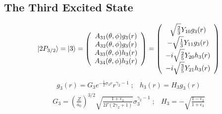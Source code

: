     \subsection{The Third Excited State}
    \begin{equation}
	|2P_{3/2} \rangle = |3 \rangle = 
		\left(
			\begin{array}{c}
				A_{31}(\theta,\phi) g_3(r) \\
				A_{32}(\theta,\phi) g_3(r) \\
				A_{33}(\theta,\phi) h_3(r) \\
				A_{34}(\theta,\phi) h_3(r)
			\end{array}
		\right)
		=
		\left(
			\begin{array}{c}
				\sqrt{\frac{2}{3}} Y_{10} g_3(r) \\
			   -\sqrt{\frac{1}{3}} Y_{11} g_3(r) \\
			 -i \sqrt{\frac{2}{5}} Y_{20} h_3(r) \\
			 -i \sqrt{\frac{3}{5}} Y_{21} h_3(r)
			\end{array}
		\right)
\end{equation}
\begin{equation}
    \begin{array}{cc}
		g_3(r) = G_3 e^{-\frac{1}{2}\sigma_3 r}	r^{\gamma_2 - 1} 
        \; ; &
        h_3(r) = H_3 g_3(r)
    \end{array}
\end{equation}
\[
\begin{array}{cc}
	G_3 =  	\left( \frac{Z}{a_0} \right)^{3/2}
			  \sqrt{ \frac{1 + \epsilon_3}{2\Gamma(2\gamma_2 + 1)} }
			  \sigma_3^{\gamma_2 - 1}
    \; ; &
	H_3  =   -\sqrt{ \frac{1 - \epsilon_3}{1 + \epsilon_3} }
\end{array}
\]


